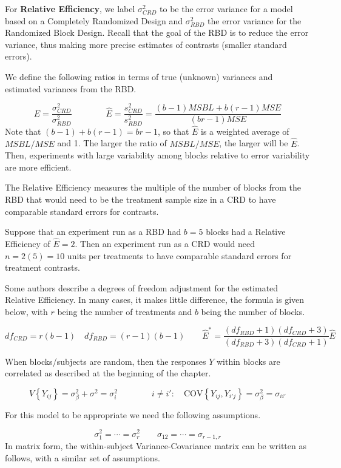 \documentclass[
]{book}
\begin{document}
For \textbf{Relative Efficiency}, we label \(\sigma_{CRD}^2\) to be the
error variance for a model based on a Completely Randomized Design and
\(\sigma_{RBD}^2\) the error variance for the Randomized Block Design.
Recall that the goal of the RBD is to reduce the error variance, thus
making more precise estimates of contrasts (smaller standard errors).

We define the following ratios in terms of true (unknown) variances and
estimated variances from the RBD.

\[
E=\frac{\sigma_{CRD}^2}{\sigma_{RBD}^2}    \qquad \qquad
\hat{E}=\frac{s_{CRD}^2}{s_{RBD}^2} = 
\frac{(b-1)MSBL+b(r-1)MSE}{(br-1)MSE} 
\] Note that \((b-1)+b(r-1)=br-1\), so that \(\hat{E}\) is a weighted
average of \(MSBL/MSE\) and 1. The larger the ratio of \(MSBL/MSE\), the
larger will be \(\hat{E}\). Then, experiments with large variability
among blocks relative to error variability are more efficient.

The Relative Efficiency measures the multiple of the number of blocks
from the RBD that would need to be the treatment sample size in a CRD to
have comparable standard errors for contrasts.

Suppose that an experiment run as a RBD had \(b=5\) blocks had a
Relative Efficiency of \(\hat{E}=2\). Then an experiment run as a CRD
would need \(n=2(5)=10\) units per treatments to have comparable
standard errors for treatment contrasts.

Some authors describe a degrees of freedom adjustment for the estimated
Relative Efficiency. In many cases, it makes little difference, the
formula is given below, with \(r\) being the number of treatments and
\(b\) being the number of blocks.

\[
df_{CRD}=r(b-1) \quad df_{RBD}=(r-1)(b-1)  \qquad
\hat{E}^*=
\frac{\left(df_{RBD}+1\right)\left(df_{CRD}+3\right)}
     {\left(df_{RBD}+3\right)\left(df_{CRD}+1\right)}
     \hat{E}
\]

When blocks/subjects are random, then the responses \(Y\) within blocks
are correlated as described at the beginning of the chapter.

\[
V\left\{Y_{ij}\right\}=\sigma_{\beta}^2+\sigma^2 = \sigma_i^2
\qquad\qquad
i\ne i': \quad \mbox{COV}\left\{Y_{ij},Y_{i'j}\right\}=\sigma_{\beta}^2=\sigma_{ii'}
\]

For this model to be appropriate we need the following assumptions.

\[
\sigma_1^2=\cdots =\sigma_r^2 \qquad \sigma_{12}=\cdots =\sigma_{r-1,r}
\] In matrix form, the within-subject Variance-Covariance matrix can be
written as follows, with a similar set of assumptions.
\end{document}
